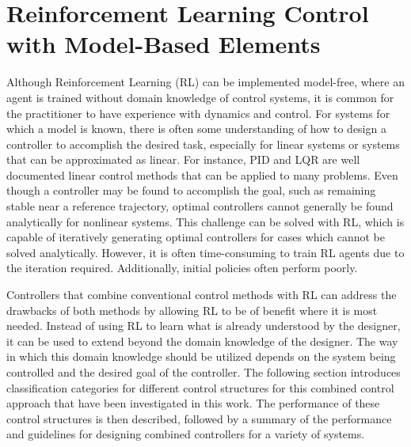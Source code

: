 
\chapter{Reinforcement Learning Control with Model-Based Elements}
\label{chapter2}

Although Reinforcement Learning (RL) can be implemented model-free, where an agent is trained without domain knowledge of control systems, it is common for the practitioner to have experience with dynamics and control.
For systems for which a model is known, there is often some understanding of how to design a controller to accomplish the desired task, especially for linear systems or systems that can be approximated as linear. For instance, PID and LQR are well documented linear control methods that can be applied to many problems.
%
Even though a controller may be found to accomplish the goal, such as remaining stable near a reference trajectory, optimal controllers cannot generally be found analytically for nonlinear systems. This challenge can be solved with RL, which is capable of iteratively generating optimal controllers for cases which cannot be solved analytically. However, it is often time-consuming to train RL agents due to the iteration required. Additionally, initial policies often perform poorly.
%

Controllers that combine conventional control methods with RL can
address the drawbacks of both methods by allowing RL to be of benefit where it is most needed.
%
Instead of using RL to learn what is already understood by the designer, it can be used to extend beyond the domain knowledge of the designer.
%
The way in which this domain knowledge should be utilized depends on the system being controlled and the desired goal of the controller. The following section introduces classification categories for different control structures for this combined control approach that have been investigated in this work. The performance of these control structures is then described, followed by a summary of the performance and
guidelines for designing combined controllers for a variety of systems.

